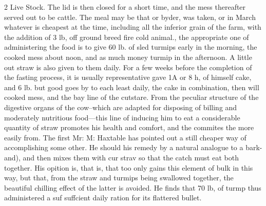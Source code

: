 \documentclass[10pt]{article}
\begin{document}
\begin{multicols}{2}\raggedcolumns
Live Stock. The lid is then closed for a short time, and the mess thereafter served out to be cattle. The meal may be that or byder, was taken, or in March whatever is cheapest at the time, including all the inferior grain of the farm, with the addition of 3 lb, off ground breed fire cold animal., the appropriate one of administering the food is to give 60 lb. of sled turmips early in the morning, the cooked mess about noon, and as much money turmip in the afternoon. A little out straw is also given to them daily. For a few weeks before the completion of the fasting process, it is usually representative gave 1A or 8 h, of himself cake, and 6 lb. but good goes by to each least daily, the cake in combination, then will cooked mess, and the bay line of the cutstare. From the peculiar structure of the digestive organs of the cow--which are adapted for disposing of billing and moderately nutritious food—this line of inducing him to eat a considerable quantity of straw promotes his health and comfort, and the commites the more easily from. The first Mr: M: Haxtable has pointed out a still cheaper way of accomplishing some other. He should his remedy by a natural analogue to a bark-and), and then mixes them with cur strav so that the catch must eat both together. His opition is, that is, that too only gains this element of bulk in this way, but that, from the straw and turmips being swallowed together, the beautiful chilling effect of the latter is avoided. He finds that 70 lb, of turmp thus administered a suf suffcient daily ration for its flattered bullet.


\end{multicols}
\end{document}
